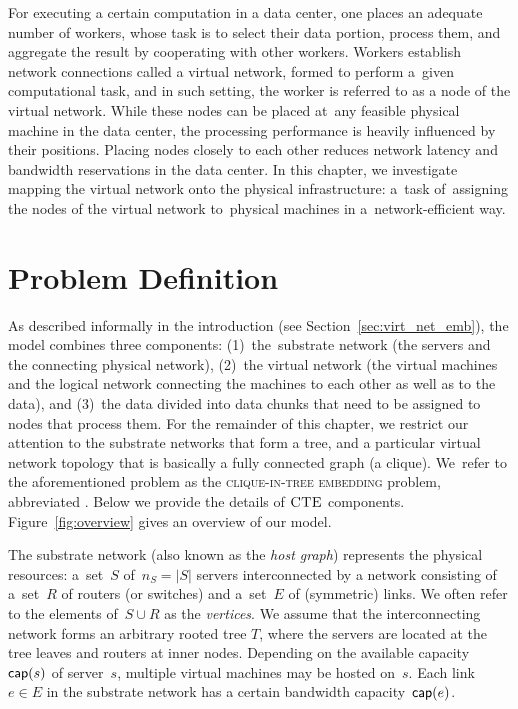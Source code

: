 
For executing a certain computation in a data center, one places an adequate number of workers, whose task is to select their data portion, process them, and aggregate the result by cooperating with other workers.
Workers establish network connections called a virtual network, formed to perform a~given computational task, and in such setting, the worker is referred to as a node of the virtual network.
While these nodes can be placed at~any feasible physical machine in the data center, the processing performance is heavily influenced by their positions.
Placing nodes closely to each other reduces network latency and bandwidth reservations in the data center.
In this chapter, we investigate mapping the virtual network onto the physical infrastructure: a~task of~assigning the nodes of the virtual network to~physical machines in a~network-efficient way.

\section{Problem Definition}\label{sec:model}

As described informally in the introduction (see Section~\ref{sec:virt_net_emb}), the model combines three components: (1)~the~substrate network (the servers
and the connecting physical network),
(2)~the virtual network (the virtual machines and the logical network connecting the machines to each other
as well as to the data), and (3)~the data divided into data chunks that need to be assigned to nodes that process them.
For the remainder of this chapter, we restrict our attention to the substrate networks that form a tree, and a particular virtual network topology that is basically a fully connected graph (a clique).
We~refer to the aforementioned problem as the \textsc{clique-in-tree embedding} problem, abbreviated \CTE.
Below we provide the details of $\textsc{CTE}$ components. Figure~\ref{fig:overview} gives an overview of our model.


 The substrate network (also known as the \emph{host graph}) represents the physical resources:
a~set~$S$ of~$n_S=|S|$ servers interconnected by a network consisting of a~set~$R$ of routers (or switches)
and a~set~$E$ of (symmetric) links. We often refer to the elements of~$S\cup R$
as the \emph{vertices}. We assume that the interconnecting network forms an arbitrary rooted tree $T$,
where the servers are located at the tree leaves and routers at inner nodes.
Depending on the available capacity~$\textsf{cap}(s)$ of server~$s$, multiple virtual machines may be hosted on~$s$.
Each link~$e\in E$ in the substrate network has a certain bandwidth capacity~$\textsf{cap}(e)$.

